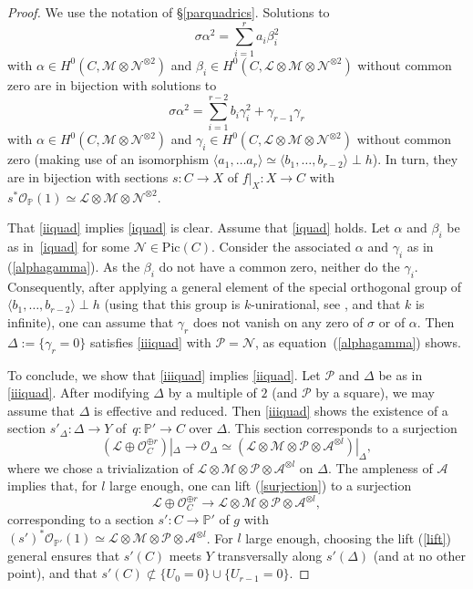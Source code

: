 \documentclass{amsart}
\theoremstyle{definition}
\theoremstyle{remark}
\numberwithin{equation}{section}
\newcommand{\Pic}{\mathrm{Pic}}
\def\P{\mathbb P}
\def\cA{\mathcal{A}}
\def\cN{\mathcal{N}}
\def\cM{\mathcal{M}}
\def\cL{\mathcal{L}}
\def\cO{\mathcal{O}}
\def\cM{\mathcal{M}}
\def\cP{\mathcal{P}}
\begin{document}
\begin{proof}
We use the notation of \S\ref{parquadrics}. 
Solutions to 
\begin{equation}
\label{alphabeta}
\sigma\alpha^2=\sum_{i=1}^ra_i\beta_{i}^2
\end{equation}
with $\alpha\in H^0(C,\cM\otimes\cN^{\otimes 2})$ and $\beta_{i}\in H^0(C,\cL\otimes\cM\otimes\cN^{\otimes 2})$ without common zero are in bijection with solutions to 
\begin{equation}
\label{alphagamma}
\sigma\alpha^2=\sum_{i=1}^{r-2}b_i\gamma_{i}^2+\gamma_{r-1}\gamma_r
\end{equation}
with $\alpha\in H^0(C,\cM\otimes\cN^{\otimes 2})$ and $\gamma_{i}\in H^0(C,\cL\otimes\cM\otimes\cN^{\otimes 2})$ without common zero (making use of an isomorphism $\langle a_1,\dots a_r\rangle\simeq \langle b_1,\dots, b_{r-2}\rangle\perp h$).
In turn, they are in bijection with sections $s:C\to X$ of $f|_X:X\to C$ with $s^*\cO_{\P}(1)\simeq\cL\otimes\cM\otimes\cN^{\otimes 2}$.

That \ref{iiquad} implies \ref{iquad} is clear.
Assume that \ref{iquad} holds. Let  $\alpha$ and $\beta_i$ be as in~\ref{iquad} for some $\cN\in\Pic(C)$.
Consider the associated $\alpha$ and $\gamma_i$ as in (\ref{alphagamma}). As the $\beta_i$ do not have a common zero, neither do the $\gamma_i$.
Consequently, after applying a general element of the special orthogonal group of $\langle b_1,\dots, b_{r-2}\rangle\perp h$ (using that this group is $k$\nobreakdash-unirational, 
see \cite[V, Theorem 18.2]{Borel}, and that $k$ is infinite), one can assume that $\gamma_r$ does not vanish on any zero of $\sigma$ or of $\alpha$.
Then~$\Delta:=\{\gamma_r=0\}$ satisfies \ref{iiiquad} with $\cP=\cN$, as equation~(\ref{alphagamma}) shows.

To conclude, we show that \ref{iiiquad} implies \ref{iiquad}.
Let $\cP$ and $\Delta$ be as in \ref{iiiquad}. After modifying $\Delta$ by a multiple of $2$ (and $\cP$ by a square), we may assume that $\Delta$ is effective and reduced. Then \ref{iiiquad} shows the existence of a section $s'_{\Delta}:\Delta\to Y$ of~$q:\P'\to C$ over $\Delta$. This section corresponds to a surjection 
\begin{equation}
\label{surjection}
(\cL\oplus\cO_C^{\oplus r})|_{\Delta}\to\cO_{\Delta}\simeq (\cL\otimes \cM\otimes \cP\otimes \cA^{\otimes l})|_{\Delta},
\end{equation}
where we chose a trivialization of $\cL\otimes \cM\otimes \cP\otimes \cA^{\otimes l}$ on $\Delta$. 
The ampleness of $\cA$ implies that, for $l$ large enough, one can lift (\ref{surjection}) to a surjection 
\begin{equation}
\label{lift}
\cL\oplus\cO_C^{\oplus r}\to\cL\otimes \cM\otimes \cP\otimes \cA^{\otimes l},
\end{equation}
corresponding to a section $s':C\to\P'$ of $g$ with $(s')^*\cO_{\P'}(1)\simeq\cL\otimes \cM\otimes \cP\otimes \cA^{\otimes l}$. For $l$ large enough, choosing the lift (\ref{lift}) general ensures that $s'(C)$ meets $Y$ transversally along $s'(\Delta)$ (and at no other point), and that $s'(C)\not\subset\{U_0=0\}\cup\{U_{r-1}=0\}$.


\end{proof}
\end{document}

